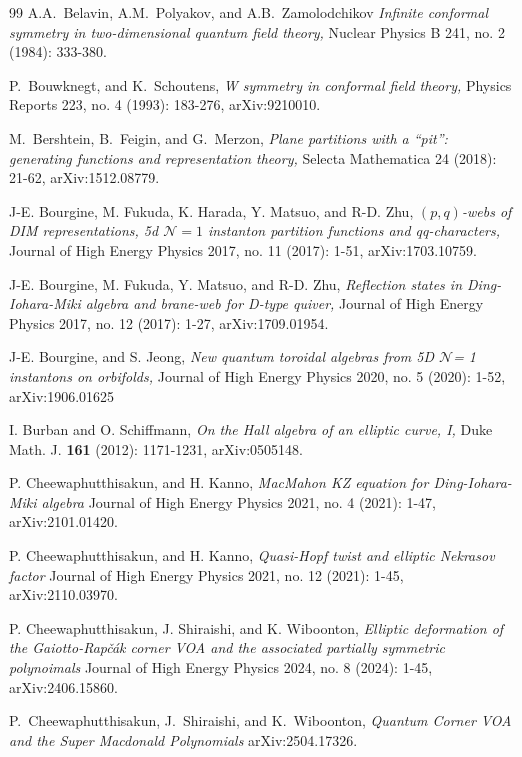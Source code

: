 \documentclass[12pt,reqno,a4paper]{amsart}
\numberwithin{equation}{section}
\theoremstyle{definition}
\begin{document}
\begin{thebibliography}{99}
A.A.~Belavin, A.M.~Polyakov, and A.B.~Zamolodchikov
{\it Infinite conformal symmetry in two-dimensional quantum field theory,}
Nuclear Physics B 241, no. 2 (1984): 333-380. 

P.~Bouwknegt, and K.~Schoutens,
{\it W symmetry in conformal field theory,}
Physics Reports 223, no. 4 (1993): 183-276,
arXiv:9210010. 	

M.~Bershtein, B.~Feigin, and G.~Merzon,
{\it Plane partitions with a “pit”: generating functions and representation theory,}
Selecta Mathematica 24 (2018): 21-62, 
arXiv:1512.08779.

J-E. Bourgine, M. Fukuda, K. Harada, Y. Matsuo, and R-D. Zhu, 
{\it $(p,q)$-webs of DIM representations, 5d $\mathcal {N}= 1$ instanton partition functions and qq-characters,}
Journal of High Energy Physics 2017, no. 11 (2017): 1-51, 
arXiv:1703.10759. 

J-E. Bourgine, M. Fukuda, Y. Matsuo, and R-D. Zhu,
{\it Reflection states in Ding-Iohara-Miki algebra and brane-web for D-type quiver,}
Journal of High Energy Physics 2017, no. 12 (2017): 1-27, 
arXiv:1709.01954. 

J-E. Bourgine, and S. Jeong,
{\it New quantum toroidal algebras from 5D $\mathcal {N}$= 1 instantons on orbifolds,}
Journal of High Energy Physics 2020, no. 5 (2020): 1-52,
arXiv:1906.01625	

I. Burban and O. Schiffmann,
{\it On the Hall algebra of an elliptic curve, I,}
Duke Math. J. \textbf{161} (2012): 1171-1231,
arXiv:0505148.

P. Cheewaphutthisakun, and H. Kanno,
{\it MacMahon KZ equation for Ding-Iohara-Miki algebra}
Journal of High Energy Physics 2021, no. 4 (2021): 1-47, 
arXiv:2101.01420. 

P. Cheewaphutthisakun, and H. Kanno, 
{\it Quasi-Hopf twist and elliptic Nekrasov factor}
Journal of High Energy Physics 2021, no. 12 (2021): 1-45,
arXiv:2110.03970. 

P. Cheewaphutthisakun, J. Shiraishi, and K. Wiboonton, 
{\it Elliptic deformation of the Gaiotto-Rapčák corner VOA and the associated partially symmetric polynoimals}
Journal of High Energy Physics 2024, no. 8 (2024): 1-45, 
arXiv:2406.15860. 

P.~Cheewaphutthisakun, J.~Shiraishi, and K.~Wiboonton,
{\it Quantum Corner VOA and the Super Macdonald Polynomials}
arXiv:2504.17326. 


\end{thebibliography}
\end{document}
